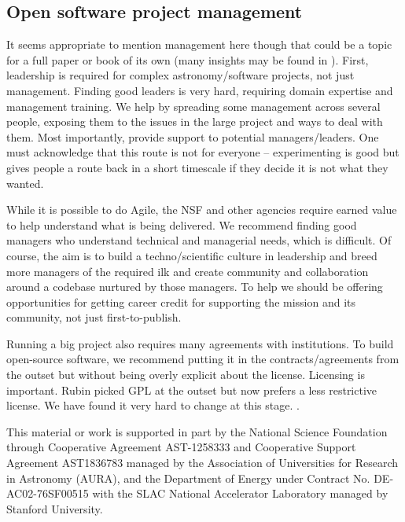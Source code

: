 \documentclass[11pt,twoside]{article}
\begin{document}
\subsection{Open software project management}
It seems appropriate to mention management here though that could be a topic for a full paper or book of its own
(many insights may be found in \citet{OMULLANE2005}).
First, leadership is required for complex astronomy/software projects, not just management.
Finding good leaders is very hard, requiring domain expertise and management training.
We help by spreading some management across several people, exposing them to the issues in the large project and ways to deal with them.
Most importantly, provide support to potential managers/leaders.
One must acknowledge that this route is not for everyone -- experimenting is good but gives people a route back in a short timescale if they decide it is not what they wanted.

While it is possible to do Agile, the NSF and other agencies require earned value \citep{2014SPIE.9150E..1EG,2016SPIE.9911E..0NK} to help understand what is being delivered.
We recommend finding good managers who understand technical and managerial needs, which is difficult.
Of course, the aim is to build a techno/scientific culture in leadership and breed more managers of the required ilk and
create community and collaboration around a codebase nurtured by those managers.
To help
we should be offering opportunities for getting career credit for supporting the mission and its community, not just first-to-publish.

Running a big project also requires many agreements with institutions.
To build open-source software, we recommend putting it in the contracts/agreements from the outset but without being overly explicit about the license.
Licensing is important.
Rubin picked GPL at the outset but now prefers a less restrictive license.
We have found it very hard to change at this stage. .

\acknowledgments This material or work is supported in part by the National Science Foundation through Cooperative Agreement AST-1258333 and Cooperative Support Agreement AST1836783 managed by the Association of Universities for Research in Astronomy (AURA), and the Department of Energy under Contract No. DE-AC02-76SF00515 with the SLAC National Accelerator Laboratory managed by Stanford University.


\end{document}
